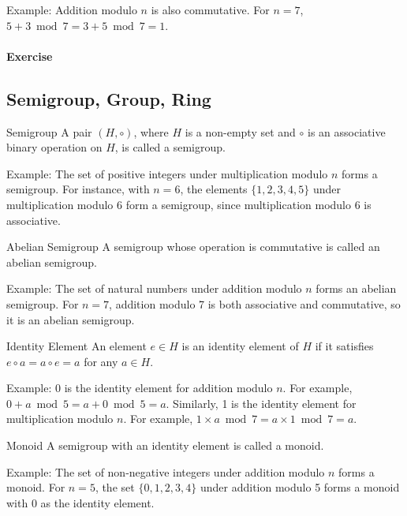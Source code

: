 \documentclass{article}
\begin{document}
Example: Addition modulo $n$ is also commutative. For $n = 7$, $5 + 3 \bmod 7 = 3 + 5 \bmod 7 = 1$.

\paragraph{Exercise}

\subsection{Semigroup, Group, Ring}

\begin{definition}{Semigroup}{}
A pair $(H, \circ)$, where $H$ is a non-empty set and $\circ$ is an associative binary operation on $H$, is called a semigroup.
\end{definition}

Example: The set of positive integers under multiplication modulo $n$ forms a semigroup. For instance, with $n = 6$, the elements $\{1, 2, 3, 4, 5\}$ under multiplication modulo 6 form a semigroup, since multiplication modulo 6 is associative.

\begin{definition}{Abelian Semigroup}{}
A semigroup whose operation is commutative is called an abelian semigroup.
\end{definition}

Example: The set of natural numbers under addition modulo $n$ forms an abelian semigroup. For $n = 7$, addition modulo 7 is both associative and commutative, so it is an abelian semigroup.

\begin{definition}{Identity Element}{}
An element $e \in H$ is an identity element of $H$ if it satisfies $e \circ a = a \circ e = a$ for any $a \in H$.
\end{definition}

Example: 0 is the identity element for addition modulo $n$. For example, $0 + a \bmod 5 = a + 0 \bmod 5 = a$. Similarly, 1 is the identity element for multiplication modulo $n$. For example, $1 \times a \bmod 7 = a \times 1 \bmod 7 = a$.

\begin{definition}{Monoid}{}
A semigroup with an identity element is called a monoid.
\end{definition}

Example: The set of non-negative integers under addition modulo $n$ forms a monoid. For $n = 5$, the set $\{0, 1, 2, 3, 4\}$ under addition modulo 5 forms a monoid with 0 as the identity element.
\end{document}
